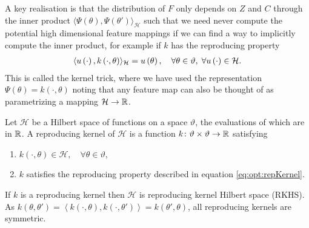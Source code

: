 A key realisation is that the distribution of $F$ only depends on $Z$ and $C$ through the inner product $\langle\Psi\left(\theta\right), \Psi\left(\theta'\right)\rangle_{\mathcal{H}}$ such that we need never compute the potential high dimensional feature mappings if we can find a way to implicitly compute the inner product, for example if $k$ has the reproducing property 
\begin{align}
\label{eq:opt:repKernel}
\langle u \left(\cdot\right), k\left(\cdot,\theta\right)\rangle_{\mathcal{H}} = u\left(\theta\right), \quad \forall \theta \in \vartheta, \; \forall u\left(\cdot\right) \in \mathcal{H}.
\end{align}
This is called the kernel trick, where we have used the representation $\Psi\left(\theta\right) = k\left(\cdot,\theta\right)$ noting that any feature map can also be thought of as parametrizing a mapping $\mathcal{H} \rightarrow \mathbb{R}$.  
\begin{definition}{}
	\label{def:opt:RKHS}
	Let $\mathcal{H}$ be a Hilbert space of functions on a space $\vartheta$, the evaluations of which are in $\mathbb{R}$.  A reproducing kernel of $\mathcal{H}$ is a function $k \colon \vartheta \times \vartheta \rightarrow \mathbb{R}$ satisfying
	\begin{enumerate}
		\item $k\left(\cdot,\theta\right) \in \mathcal{H}, \quad \forall \theta \in \vartheta$,
		\item $k$ satisfies the reproducing property described in equation \eqref{eq:opt:repKernel}.
	\end{enumerate}
	If $k$ is a reproducing kernel then $\mathcal{H}$ is reproducing kernel Hilbert space (RKHS).  As $k\left(\theta,\theta'\right) = \left\langle k\left(\cdot,\theta\right), k\left(\cdot,\theta'\right)\right\rangle = k\left(\theta',\theta\right)$, all reproducing kernels are symmetric.
\end{definition}

